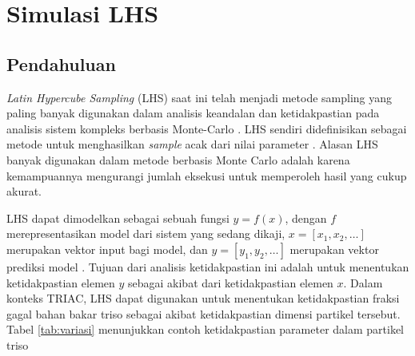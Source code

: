 \documentclass[a4paper,11pt]{report}
\begin{document}
\section{Simulasi LHS}
\label{sec:lhs}
\subsection{Pendahuluan}
\textit{Latin Hypercube Sampling} (LHS) saat ini telah menjadi metode sampling yang paling banyak digunakan dalam analisis keandalan dan ketidakpastian pada analisis sistem kompleks berbasis Monte-Carlo \cite{HELTON200323,SHIELDS201696}. LHS sendiri didefinisikan sebagai metode untuk menghasilkan \textit{sample} acak dari nilai parameter \cite{lhs}. Alasan LHS banyak digunakan dalam metode berbasis Monte Carlo adalah karena kemampuannya mengurangi jumlah eksekusi untuk memperoleh hasil yang cukup akurat.

LHS dapat dimodelkan sebagai sebuah fungsi $y=f(x)$, dengan $f$ merepresentasikan model dari sistem yang sedang dikaji, $x=[x_1, x_2, \ldots]$ merupakan vektor input bagi model, dan $y=[y_1, y_2, \ldots]$ merupakan vektor prediksi model \cite{HELTON200323}. Tujuan dari analisis ketidakpastian ini adalah untuk menentukan ketidakpastian elemen $y$ sebagai akibat dari ketidakpastian elemen $x$. Dalam konteks TRIAC, LHS dapat digunakan untuk menentukan ketidakpastian fraksi gagal bahan bakar triso sebagai akibat ketidakpastian dimensi partikel tersebut. Tabel \ref{tab:variasi} menunjukkan contoh ketidakpastian parameter dalam partikel triso \cite{report2}
\end{document}
